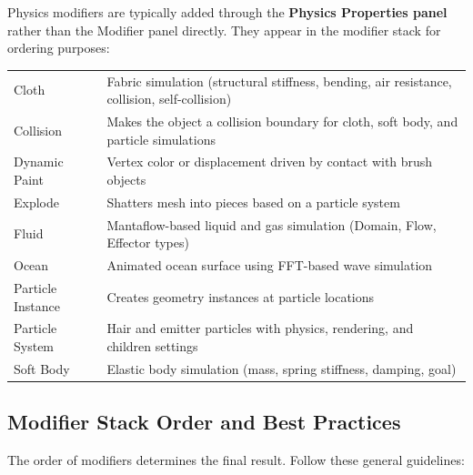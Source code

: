 Physics modifiers are typically added through the \textbf{Physics Properties panel} rather than the Modifier panel directly. They appear in the modifier stack for ordering purposes:

\begin{center}
\begin{tabularx}{\textwidth}{L{3cm}X}
\toprule
{}
 &  \\
\midrule
Cloth & Fabric simulation (structural stiffness, bending, air resistance, collision, self-collision) \\
Collision & Makes the object a collision boundary for cloth, soft body, and particle simulations \\
Dynamic Paint & Vertex color or displacement driven by contact with brush objects \\
Explode & Shatters mesh into pieces based on a particle system \\
Fluid & Mantaflow-based liquid and gas simulation (Domain, Flow, Effector types) \\
Ocean & Animated ocean surface using FFT-based wave simulation \\
Particle Instance & Creates geometry instances at particle locations \\
Particle System & Hair and emitter particles with physics, rendering, and children settings \\
Soft Body & Elastic body simulation (mass, spring stiffness, damping, goal) \\
\bottomrule
\end{tabularx}
\end{center}

\subsection{Modifier Stack Order and Best Practices}
\label{sec:modifierorder}

The order of modifiers determines the final result. Follow these general guidelines:

